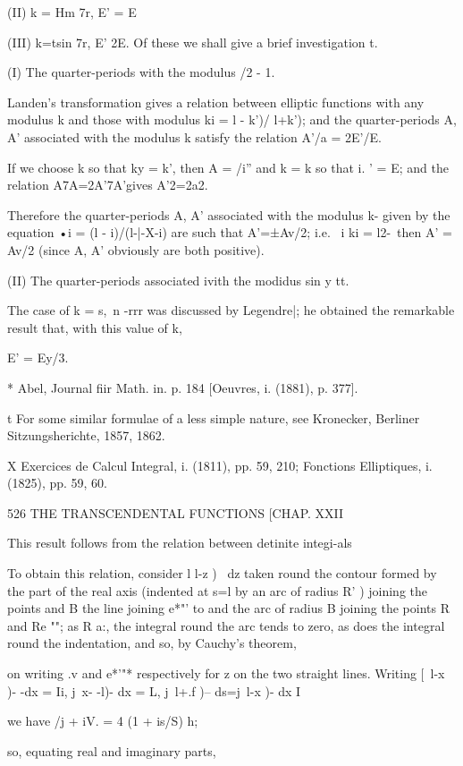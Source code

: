 (II) k = Hm 7r, E' = E %

(III) k=tsin 7r, E' 2E. Of these we shall give a brief investigation
t.

(I) The quarter-periods with the modulus /2 - 1.

Landen's transformation gives a relation between elliptic functions
with any modulus k and those with modulus ki = l - k')/ l+k'); and the
quarter-periods A, A' associated with the modulus k satisfy the
relation A'/a = 2E'/E.

If we choose k so that ky = k', then A = /i'' and k = k so that i. ' =
E; and the relation A7A=2A'7A'gives A'2=2a2.

Therefore the quarter-periods A, A' associated with the modulus k-
given by the equation •i = (l - i)/(l-|-X-i) are such that A'=±Av/2;
i.e. \ i ki = l2-\, then A' = Av/2 (since A, A' obviously are both
positive).

(II) The quarter-periods associated ivith the modidus sin y tt.

The case of k = s,\ n -rrr was discussed by Legendre|; he obtained the
remarkable result that, with this value of k,

E' = Ey/3.

* Abel, Journal fiir Math. in. p. 184 [Oeuvres, i. (1881), p. 377].

t For some similar formulae of a less simple nature, see Kronecker,
Berliner Sitzungsherichte, 1857, 1862.

X Exercices de Calcul Integral, i. (1811), pp. 59, 210; Fonctions
Elliptiques, i. (1825), pp. 59, 60.

526 THE TRANSCENDENTAL FUNCTIONS [CHAP. XXII

This result follows from the relation between detinite integi-als

To obtain this relation, consider l l-z )~ dz taken round the contour
formed by the part of the real axis (indented at s=l by an arc of
radius R' ) joining the points and B the line joining e*"' to and the
arc of radius B joining the points R and Re ""; as R a:, the
integral round the arc tends to zero, as does the integral round the
indentation, and so, by Cauchy's theorem,

on writing .v and e*'"* respectively for z on the two straight lines.
Writing [\ l-x )- -dx = Ii, j\ x- -l)- dx = L, j\ l+.f )-- ds=j\ l-x
)- dx I

we have /j + iV. = 4 (1 + is/S) h;

so, equating real and imaginary parts,

